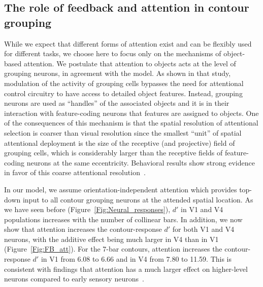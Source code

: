 \subsection{The role of feedback and attention in contour grouping}   
While we expect that different forms of attention exist and can be
flexibly used for different tasks, we choose here to focus only on the mechanisms of object-based attention.
%
We postulate that attention to objects acts at the level of grouping
neurons, in agreement with the \cite{Mihalas_etal11b} model.  As shown
in that study, modulation of the activity of grouping cells bypasses
the need for 
attentional control circuitry
to have access to detailed object features.  Instead, grouping
neurons are used as ``handles'' of the associated objects and it is in
their interaction with feature-coding neurons that features are
assigned to objects. One of the consequences of this mechanism is that
the spatial resolution of attentional selection is coarser than visual
resolution since the smallest ``unit'' of spatial attentional
deployment is the size of the receptive (and projective) field of
grouping cells, which is considerably larger than the receptive fields
of feature-coding neurons at the same eccentricity. Behavioral results
show strong evidence in favor of this coarse attentional
resolution~\citep{Intriligator_Cavanagh01}.

In our model, we assume orientation-independent attention which
provides top-down input to all contour grouping neurons at the attended
spatial location. As we have seen before (Figure~\ref{Fig:Neural_responses}), 
$d'$ in V1 and V4 populations increases with the number of
collinear bars. 
In addition, we now show that attention increases the
contour-response $d'$ for both V1 and V4 neurons, with the additive
effect being much larger in V4 than in V1
(Figure~\ref{Fig:FB_att}). For the 7-bar contours, attention increases
the contour-response $d'$ in V1 from 6.08 to 6.66 and in V4 from 7.80
to 11.59. This is consistent with findings that attention has a much
larger effect on higher-level neurons compared to early sensory
neurons~\citep[review:][]{Treue01}.

